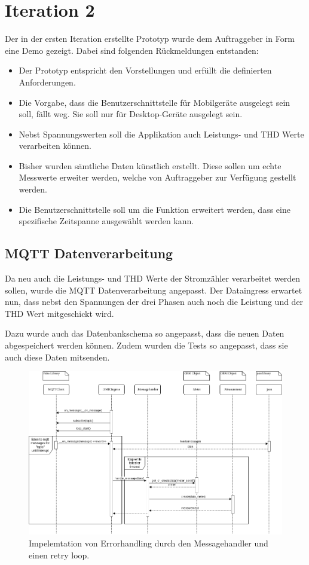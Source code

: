 \section{Iteration 2}
Der in der ersten Iteration erstellte Prototyp wurde dem Auftraggeber in Form eine Demo gezeigt.
Dabei sind folgenden Rückmeldungen entstanden:
\begin{itemize}
    \item Der Prototyp entspricht den Vorstellungen und erfüllt die definierten Anforderungen.
    \item Die Vorgabe, dass die Benutzerschnittstelle für Mobilgeräte ausgelegt sein soll, fällt weg.
          Sie soll nur für Desktop-Geräte ausgelegt sein.
    \item Nebst Spannungswerten soll die Applikation auch Leistungs- und \ac{THD} Werte verarbeiten können.
    \item Bisher wurden sämtliche Daten künstlich erstellt.
    Diese sollen um echte Messwerte erweiter werden, welche von Auftraggeber zur Verfügung gestellt werden.
    \item Die Benutzerschnittstelle soll um die Funktion erweitert werden,
    dass eine spezifische Zeitspanne ausgewählt werden kann.



\end{itemize}

\subsection{\ac{MQTT} Datenverarbeitung}

Da neu auch die Leistungs- und \ac{THD} Werte der Stromzähler verarbeitet werden sollen, wurde
die \ac{MQTT} Datenverarbeitung angepasst. Der Dataingress erwartet nun, dass nebst
den Spannungen der drei Phasen auch noch die Leistung und der \ac{THD} Wert mitgeschickt wird.

Dazu wurde auch das Datenbankschema so angepasst, dass die neuen Daten abgespeichert
werden können. Zudem wurden die Tests so angepasst, dass sie auch diese Daten
mitsenden.

\begin{figure}[h]
    \centering
    \includegraphics[width=1.0\textwidth]{gfx/dataingress-sequence}
    \caption{
        Impelemtation von Errorhandling durch den Messagehandler und einen
        retry loop.
    }
    \label{fig:dataingress-sequence}
\end{figure}

